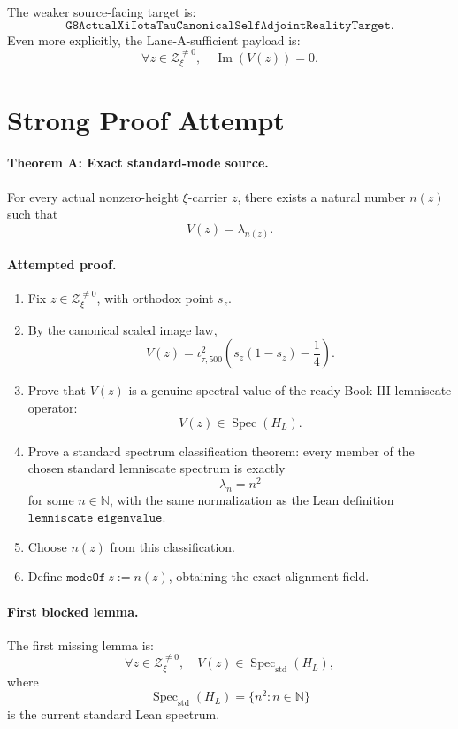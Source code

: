 \documentclass[11pt]{article}
\newcommand{\Spec}{\operatorname{Spec}}
\newcommand{\im}{\operatorname{Im}}
\begin{document}
The weaker source-facing target is:
\[
  \texttt{G8ActualXiIotaTauCanonicalSelfAdjointRealityTarget}.
\]
Even more explicitly, the Lane-A-sufficient payload is:
\[
  \forall z\in\mathcal Z_\xi^{\neq 0},\quad
  \im(V(z))=0.
\]

\section*{Strong Proof Attempt}

\paragraph{Theorem A: Exact standard-mode source.}
For every actual nonzero-height \(\xi\)-carrier \(z\), there exists a natural
number \(n(z)\) such that
\[
  V(z)=\lambda_{n(z)}.
\]

\paragraph{Attempted proof.}
\begin{enumerate}
\item Fix \(z\in\mathcal Z_\xi^{\neq 0}\), with orthodox point \(s_z\).
\item By the canonical scaled image law,
  \[
    V(z)=\iota_{\tau,500}^2
    \left(s_z(1-s_z)-\frac14\right).
  \]
\item Prove that \(V(z)\) is a genuine spectral value of the ready Book III
  lemniscate operator:
  \[
    V(z)\in \Spec(H_L).
  \]
\item Prove a standard spectrum classification theorem:
  every member of the chosen standard lemniscate spectrum is exactly
  \[
    \lambda_n=n^2
  \]
  for some \(n\in\mathbb N\), with the same normalization as the Lean
  definition \(\texttt{lemniscate\_eigenvalue}\).
\item Choose \(n(z)\) from this classification.
\item Define \(\texttt{modeOf}\ z:=n(z)\), obtaining the exact alignment field.
\end{enumerate}

\paragraph{First blocked lemma.}
The first missing lemma is:
\[
  \forall z\in\mathcal Z_\xi^{\neq 0},\quad
  V(z)\in \Spec_{\mathrm{std}}(H_L),
\]
where
\[
  \Spec_{\mathrm{std}}(H_L)=\{n^2:n\in\mathbb N\}
\]
is the current standard Lean spectrum.
\end{document}

